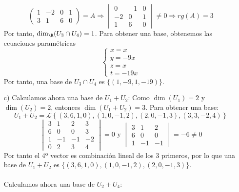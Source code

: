 \begin{ejercicio}
\begin{enumerate}
\begin{equation*}
\begin{pmatrix}
            1 & -2 & 0 & 1 \\
            3 & 1 & 6 & 0
        \end{pmatrix} = A \Rightarrow \begin{vmatrix}
            0 & -1 & 0 \\
            -2 & 0 & 1 \\
            1 & 6 & 0
        \end{vmatrix} \neq 0 \Rightarrow rg(A) = 3
    \end{equation*}
    Por tanto, $\dim_\R(U_3 \cap U_4) = 1$. Para obtener una base, obtenemos las ecuaciones paramétricas
    \begin{equation*}
        \begin{cases}
            x = x \\
            y = -9x \\
            z = x \\
            t = -19x
        \end{cases}
    \end{equation*}
    Por tanto, una base de $U_3 \cap U_4$ es $\{(1, -9, 1, -19)\}$.
    \item[c)] Calculamos ahora una base de $U_1 + U_2$:
    Como $\dim(U_1) = 2$ y $\dim(U_2) = 2$, entonces $\dim(U_1 + U_2) = 3$. Para obtener una base:
    \begin{equation*}
        U_1 + U_2 = \mathcal{L}\left\{(3,6,1,0), (1,0,-1,2), (2,0,-1,3), (3,3,-2,4)\right\}
    \end{equation*}
    \begin{equation*}
        \begin{vmatrix}
            3 & 1 & 2 & 3 \\
            6 & 0 & 0 & 3 \\
            1 & -1 & -1 & -2 \\
            0 & 2 & 3 & 4
        \end{vmatrix} = 0 \text { y } \begin{vmatrix}
            3 & 1 & 2 \\ 
            6 & 0 & 0 \\
            1 & -1 & -1 
        \end{vmatrix} = -6 \neq 0
    \end{equation*}
    Por tanto el 4º vector es combinación lineal de los 3 primeros, por lo que una base de $U_1 + U_2$ es $\{(3,6,1,0), (1,0,-1,2), (2,0,-1,3)\}$.
    \\ \\
    Calculamos ahora una base de $U_2 + U_4$:

\end{enumerate}
\end{ejercicio}
